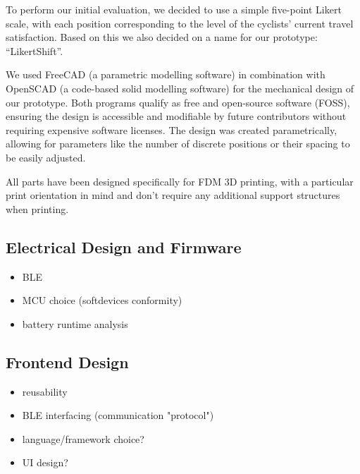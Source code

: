 To perform our initial evaluation, we decided to use a simple five-point Likert scale, with each position corresponding to the level of the cyclists' current travel satisfaction.
Based on this we also decided on a name for our prototype: “LikertShift”.

\bigbreak\noindent
We used FreeCAD (a parametric modelling software) in combination with OpenSCAD (a code-based solid modelling software) for the mechanical design of our prototype. Both programs qualify as free and open-source software (FOSS), ensuring the design is accessible and modifiable by future contributors without requiring expensive software licenses.
The design was created parametrically, allowing for parameters like the number of discrete positions or their spacing to be easily adjusted.

All parts have been designed specifically for FDM 3D printing, with a particular print orientation in mind and don't require any additional support structures when printing.

\subsection{Electrical Design and Firmware}

\begin{itemize}
    \item BLE
    \item MCU choice (softdevices conformity)
    \item battery runtime analysis
\end{itemize}

\subsection{Frontend Design}

\begin{itemize}
    \item reusability
    \item BLE interfacing (communication "protocol")
    \item language/framework choice?
    \item UI design?
\end{itemize}
